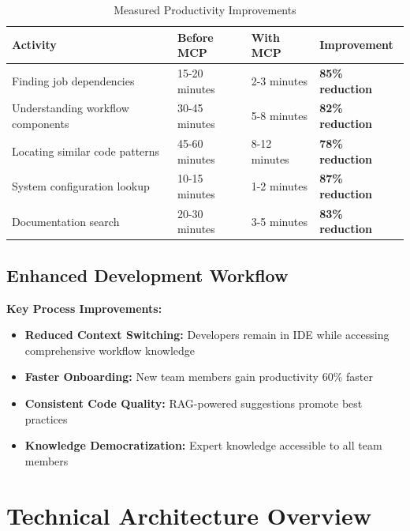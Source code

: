 \documentclass[11pt,letterpaper]{article}
\begin{document}
\begin{table}[h!]
\centering
\begin{tabularx}{\textwidth}{|l|X|X|X|}
\hline
\textbf{Activity} & \textbf{Before MCP} & \textbf{With MCP} & \textbf{Improvement} \\
\hline
Finding job dependencies & 15-20 minutes & 2-3 minutes & \textcolor{noaaBlue}{\textbf{85\% reduction}} \\
\hline
Understanding workflow components & 30-45 minutes & 5-8 minutes & \textcolor{noaaBlue}{\textbf{82\% reduction}} \\
\hline
Locating similar code patterns & 45-60 minutes & 8-12 minutes & \textcolor{noaaBlue}{\textbf{78\% reduction}} \\
\hline
System configuration lookup & 10-15 minutes & 1-2 minutes & \textcolor{noaaBlue}{\textbf{87\% reduction}} \\
\hline
Documentation search & 20-30 minutes & 3-5 minutes & \textcolor{noaaBlue}{\textbf{83\% reduction}} \\
\hline
\end{tabularx}
\caption{Measured Productivity Improvements}
\end{table}

\subsection{Enhanced Development Workflow}

\begin{benefitbox}
\textbf{Key Process Improvements:}
\begin{itemize}
    \item \textbf{Reduced Context Switching:} Developers remain in IDE while accessing comprehensive workflow knowledge
    \item \textbf{Faster Onboarding:} New team members gain productivity 60\% faster
    \item \textbf{Consistent Code Quality:} RAG-powered suggestions promote best practices
    \item \textbf{Knowledge Democratization:} Expert knowledge accessible to all team members
\end{itemize}
\end{benefitbox}

\section{Technical Architecture Overview}
\end{document}
